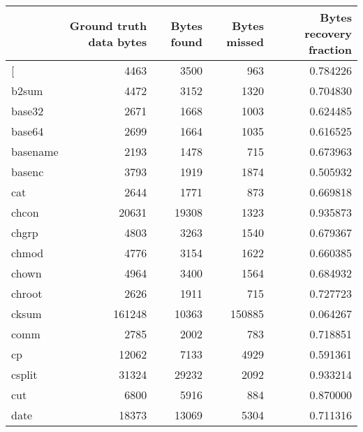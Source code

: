 \begin{tabular}{lrrrr}
\toprule
{} &  Ground truth data bytes &  Bytes found &  Bytes missed &  Bytes recovery fraction \\
\midrule
[         &                     4463 &         3500 &           963 &                 0.784226 \\
b2sum     &                     4472 &         3152 &          1320 &                 0.704830 \\
base32    &                     2671 &         1668 &          1003 &                 0.624485 \\
base64    &                     2699 &         1664 &          1035 &                 0.616525 \\
basename  &                     2193 &         1478 &           715 &                 0.673963 \\
basenc    &                     3793 &         1919 &          1874 &                 0.505932 \\
cat       &                     2644 &         1771 &           873 &                 0.669818 \\
chcon     &                    20631 &        19308 &          1323 &                 0.935873 \\
chgrp     &                     4803 &         3263 &          1540 &                 0.679367 \\
chmod     &                     4776 &         3154 &          1622 &                 0.660385 \\
chown     &                     4964 &         3400 &          1564 &                 0.684932 \\
chroot    &                     2626 &         1911 &           715 &                 0.727723 \\
cksum     &                   161248 &        10363 &        150885 &                 0.064267 \\
comm      &                     2785 &         2002 &           783 &                 0.718851 \\
cp        &                    12062 &         7133 &          4929 &                 0.591361 \\
csplit    &                    31324 &        29232 &          2092 &                 0.933214 \\
cut       &                     6800 &         5916 &           884 &                 0.870000 \\
date      &                    18373 &        13069 &          5304 &                 0.711316 \\

\end{tabular}
